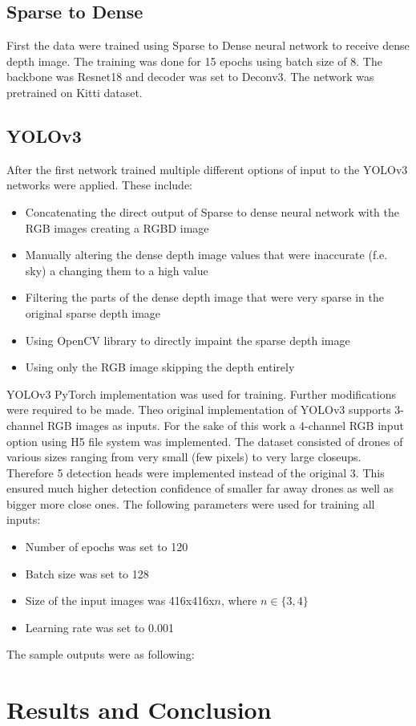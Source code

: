 \documentclass[twoside]{ctuthesis}
\theoremstyle{plain}
\theoremstyle{definition}
\theoremstyle{note}
\begin{document}
\section{Sparse to Dense}
First the data were trained using Sparse to Dense neural network to receive dense depth image. The training was done for 15 epochs using batch size of 8. The backbone was Resnet18 and decoder was set to Deconv3. The network was pretrained on Kitti dataset. 
\section{YOLOv3}
After the first network trained multiple different options of input to the YOLOv3 networks were applied. These include:
\begin{itemize}
	\item Concatenating the direct output of Sparse to dense neural network with the RGB images creating a RGBD image
	\item Manually altering the dense depth image values that were inaccurate (f.e. sky) a changing them to a high value
	\item Filtering the parts of the dense depth image that were very sparse in the original sparse depth image
	\item Using OpenCV library to directly impaint the sparse depth image
	\item Using only the RGB image skipping the depth entirely
\end{itemize}
YOLOv3 PyTorch implementation was used for training. Further modifications were required to be made. Theo original implementation of YOLOv3 supports 3-channel RGB images as inputs. For the sake of this work a 4-channel RGB input option using H5 file system was implemented. The dataset consisted of drones of various sizes ranging from very small (few pixels) to very large closeups. Therefore 5 detection heads were implemented instead of the original 3. This ensured much higher detection confidence of smaller far away drones as well as bigger more close ones. The following parameters were used for training all inputs:
\begin{itemize}
	\item Number of epochs was set to 120
	\item Batch size was set to 128
	\item Size of the input images was 416x416x$n$, where $n\in\{3,4\}$
	\item Learning rate was set to 0.001
\end{itemize}
The sample outputs were as following:
\chapter{Results and Conclusion}
\end{document}
